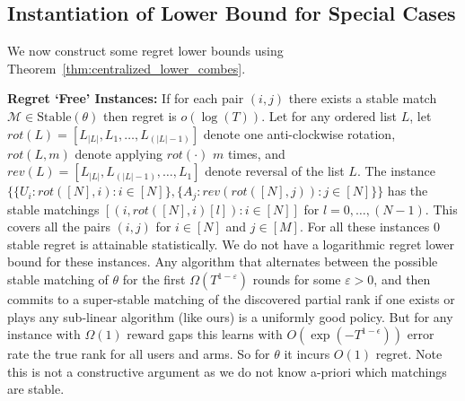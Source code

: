 \documentclass{article}
\begin{document}
\subsection{Instantiation of Lower Bound for Special Cases}
We now construct some regret lower bounds using Theorem~\ref{thm:centralized_lower_combes}.

\textbf{Regret `Free' Instances:} If for each pair $(i,j)$ there exists a stable match $\mathcal{M} \in \mathrm{Stable}(\theta)$ then regret is $o(\log(T))$. 
Let for any ordered list $L$, let $rot(L) = [L_{|L|}, L_1, \dots, L_{(|L|-1)}]$ denote one anti-clockwise rotation, $rot(L, m)$ denote applying $rot(\cdot)$ $m$ times, and  $rev(L) = [L_{|L|},L_{(|L|-1)}, \dots, L_1]$ denote reversal of the list $L$. The instance
$
\{\{ U_i: rot([N],i): i\in [N] \}, \{A_j: rev(rot([N],j)): j \in [N]\}\}
$
has the stable matchings $[(i, rot([N],i)[l]): i \in [N]]$ for $l=0, \dots, (N-1)$. This covers all the pairs $(i,j)$ for $i \in [N]$ and $j \in [M]$. For all these instances $0$ stable regret is attainable statistically.  We do not have a logarithmic  regret lower bound for these instances. Any algorithm that alternates between the possible stable matching of $\theta$ for the first $\Omega(T^{1- \varepsilon})$ rounds for some $\varepsilon > 0$, and then commits to a super-stable matching of the discovered partial rank if one exists or plays any sub-linear algorithm (like ours) is a  uniformly good policy. But for any instance with $\Omega(1)$ reward gaps this learns with $O(\exp(-T^{1- \epsilon}))$ error rate the true rank for all users and arms. So for $\theta$ it incurs $O(1)$ regret.  Note this is not a constructive argument as we do not know a-priori which matchings are stable. 
\end{document}
